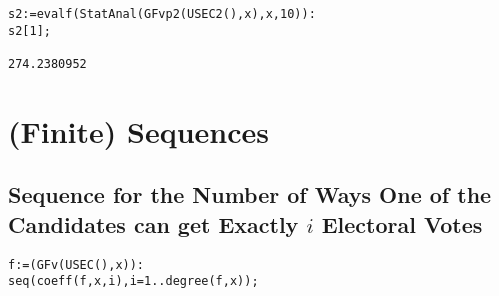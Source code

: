 \documentclass[12pt]{article}
\begin{document}
\begin{verbatim}
s2:=evalf(StatAnal(GFvp2(USEC2(),x),x,10)):
s2[1];

274.2380952
\end{verbatim}

\section{(Finite) Sequences}
\subsection{Sequence for the Number of Ways One of the Candidates can get Exactly $i$ Electoral Votes}

\begin{verbatim}
f:=(GFv(USEC(),x)):
seq(coeff(f,x,i),i=1..degree(f,x));


\end{verbatim}
\end{document}
